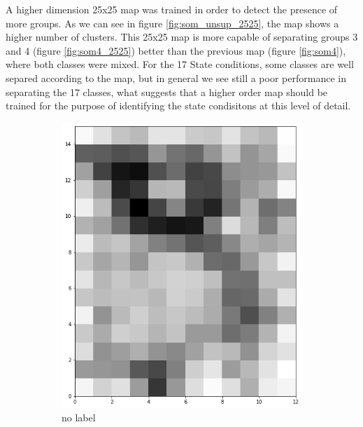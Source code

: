 \documentclass[twocolumn]{article}
\begin{document}
A higher dimension 25x25 map was trained in order to detect the presence of more groups. As we can see in figure \ref{fig:som_unsup_2525}, the map shows a higher number of clusters. This 25x25 map is more capable of separating groups 3 and 4 (figure \ref{fig:som4_2525}) better than the previous map (figure \ref{fig:som4}), where both classes were mixed. For the 17 State conditions, some classes are well separed according to the map, but in general we see still a poor performance in separating the 17 classes, what suggests that a higher order map should be trained for the purpose of identifying the state condisitons at this level of detail.

\begin{figure}
      \centering
      \begin{subfigure}{0.245\textwidth}
            \includegraphics[width=\textwidth]{som_unsup.png}
            \caption{no label}
            \label{fig:som_unsup}
      \end{subfigure}
      \begin{subfigure}{0.245\textwidth}
            \centering

\end{subfigure}
\end{figure}
\end{document}
